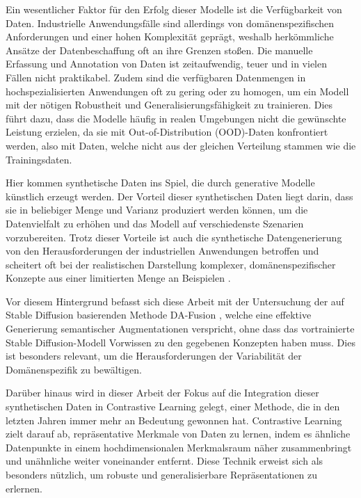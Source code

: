 Ein wesentlicher Faktor für den Erfolg dieser Modelle ist die Verfügbarkeit von Daten. Industrielle Anwendungsfälle sind allerdings von domänenspezifischen Anforderungen und einer hohen Komplexität geprägt, weshalb herkömmliche Ansätze der Datenbeschaffung oft an ihre Grenzen stoßen. Die manuelle Erfassung und Annotation von Daten ist zeitaufwendig, teuer und in vielen Fällen nicht praktikabel. Zudem sind die verfügbaren Datenmengen in hochspezialisierten Anwendungen oft zu gering oder zu homogen, um ein Modell mit der nötigen Robustheit und Generalisierungsfähigkeit zu trainieren. Dies führt dazu, dass die Modelle häufig in realen Umgebungen nicht die gewünschte Leistung erzielen, da sie mit Out-of-Distribution (OOD)-Daten konfrontiert werden, also mit Daten, welche nicht aus der gleichen Verteilung stammen wie die Trainingsdaten.

Hier kommen synthetische Daten ins Spiel, die durch generative Modelle künstlich erzeugt werden. Der Vorteil dieser synthetischen Daten liegt darin, dass sie in beliebiger Menge und Varianz produziert werden können, um die Datenvielfalt zu erhöhen und das Modell auf verschiedenste Szenarien vorzubereiten. Trotz dieser Vorteile ist auch die synthetische Datengenerierung von den Herausforderungen der industriellen Anwendungen betroffen und scheitert oft bei der realistischen Darstellung komplexer, domänenspezifischer Konzepte aus einer limitierten Menge an Beispielen \parencite{Lu2024syntheticdatareview}.

Vor diesem Hintergrund befasst sich diese Arbeit mit der Untersuchung der auf Stable Diffusion basierenden Methode DA-Fusion \parencite{Trabucco2023dafusion}, welche eine effektive Generierung semantischer Augmentationen verspricht, ohne dass das vortrainierte Stable Diffusion-Modell Vorwissen zu den gegebenen Konzepten haben muss. Dies ist besonders relevant, um die Herausforderungen der Variabilität der Domänenspezifik zu bewältigen.

Darüber hinaus wird in dieser Arbeit der Fokus auf die Integration dieser synthetischen Daten in Contrastive Learning gelegt, einer Methode, die in den letzten Jahren immer mehr an Bedeutung gewonnen hat. Contrastive Learning zielt darauf ab, repräsentative Merkmale von Daten zu lernen, indem es ähnliche Datenpunkte in einem hochdimensionalen Merkmalsraum näher zusammenbringt und unähnliche weiter voneinander entfernt. Diese Technik erweist sich als besonders nützlich, um robuste und generalisierbare Repräsentationen zu erlernen.


